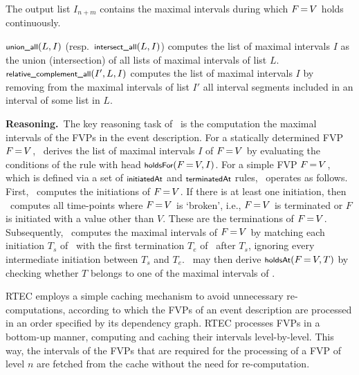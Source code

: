 \begin{definition}
%
%
%
The output list $I_{n{+}m}$ contains the maximal intervals during which $F\operatorname{=} V$ holds continuously.
\qeddef
\end{definition}
%
$\unionall(L, I)$ (resp.~$\intersectall(L,I)$) computes the list of maximal intervals $I$ as the union (intersection) of all lists of maximal intervals of list $L$.
%
$\complementall(I', L, I)$ computes the list of maximal intervals $I$ by removing from the maximal intervals of list $I'$ all interval segments included in an interval of some list in $L$.
%

\textbf{Reasoning.}~The key reasoning task of \rtec\ is the computation the maximal intervals of the FVPs in the event description.  
%
For a statically determined FVP $F\operatorname{=} V$, \rtec\ derives the list of maximal intervals $I$ of $F\operatorname{=} V$ by evaluating the conditions of the rule with head $\holdsFor(F\val V, I)$.
%
For a simple FVP $F\operatorname{=} V$, which is defined via a set of $\initiatedAt$ and $\terminatedAt$ rules, \rtec\ operates as follows.
%
First, \rtec\ computes the initiations of $F\operatorname{=} V$. 
%
If there is at least one initiation, then \rtec\ computes all time-points where $F\operatorname{=} V$ is `broken', i.e., $F\operatorname{=} V$ is terminated or $F$ is initiated with a value other than $V$.
%
These are the terminations of $F\operatorname{=} V$.
%
Subsequently, \rtec\ computes the maximal intervals of $F\operatorname{=} V$ by matching each initiation $T_s$ of \fv\ with the first termination $T_e$ of \fv\ after $T_s$, ignoring every intermediate initiation between $T_s$ and $T_e$.
%
\rtec\ may then derive $\holdsAt(F\val V, T)$ by checking whether $T$ belongs to one of the maximal intervals of \fv.

RTEC employs a simple caching mechanism to avoid unnecessary re-computations, according to which the FVPs of an event description are processed in an order specified by its dependency graph.
%
RTEC processes FVPs in a bottom-up manner, computing and caching their intervals level-by-level. This way, the intervals of the FVPs that are required for the processing of a FVP of level $n$ are fetched from the cache without the need for re-computation. 

